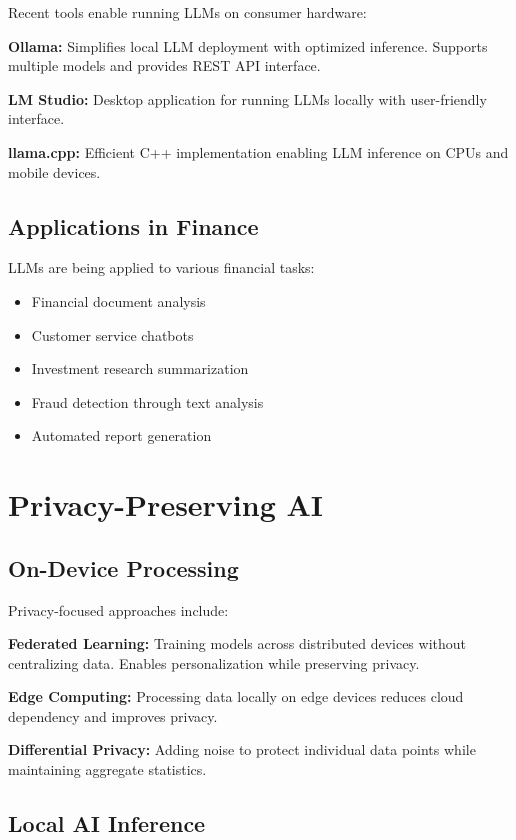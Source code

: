 \documentclass[11pt,a4paper]{report}
\begin{document}
Recent tools enable running LLMs on consumer hardware:

\textbf{Ollama:} Simplifies local LLM deployment with optimized inference. Supports multiple models and provides REST API interface.

\textbf{LM Studio:} Desktop application for running LLMs locally with user-friendly interface.

\textbf{llama.cpp:} Efficient C++ implementation enabling LLM inference on CPUs and mobile devices.

\subsection{Applications in Finance}

LLMs are being applied to various financial tasks:

\begin{itemize}
    \item Financial document analysis
    \item Customer service chatbots
    \item Investment research summarization
    \item Fraud detection through text analysis
    \item Automated report generation
\end{itemize}

\section{Privacy-Preserving AI}

\subsection{On-Device Processing}

Privacy-focused approaches include:

\textbf{Federated Learning:} Training models across distributed devices without centralizing data. Enables personalization while preserving privacy.

\textbf{Edge Computing:} Processing data locally on edge devices reduces cloud dependency and improves privacy.

\textbf{Differential Privacy:} Adding noise to protect individual data points while maintaining aggregate statistics.

\subsection{Local AI Inference}
\end{document}
